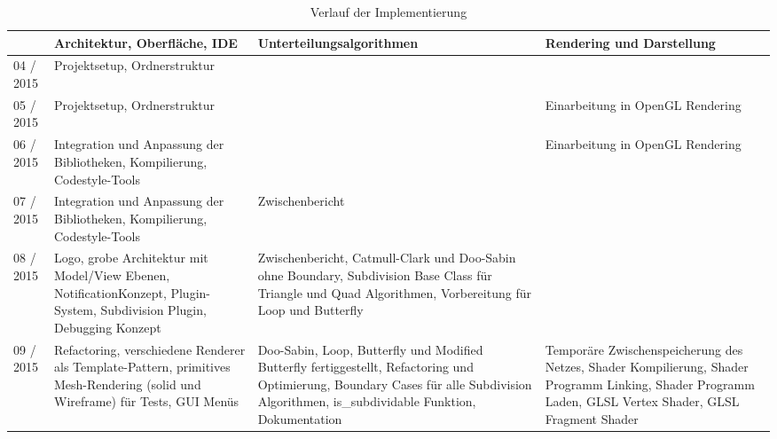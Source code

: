 \begin{table}[]
\vspace*{-40mm}

\center
\caption{Verlauf der Implementierung}

\hspace*{-24mm}
\begin{tabular}{|p{1.6cm}|p{5cm}|p{5cm}|p{5cm}|}
\hline
		  
		  & Architektur, Oberfläche, IDE
      	  & Unterteilungsalgorithmen
      	  & Rendering und Darstellung
      	  \\
    	  
\hline
          
04 / 2015 & Projektsetup, Ordnerstruktur 
          & 
          &
      	  \\
         
\hline

05 / 2015 & Projektsetup, Ordnerstruktur
		  & 
		  & Einarbeitung in OpenGL Rendering
		  \\
		  
\hline

06 / 2015 & Integration und Anpassung
			der Bibliotheken, Kompilierung,
			Codestyle-Tools
		  &
		  & Einarbeitung in OpenGL Rendering
		  \\
		  
\hline

07 / 2015 & Integration und Anpassung
			der Bibliotheken, Kompilierung,
			Codestyle-Tools
		  & Zwischenbericht
		  &
		  \\
		  
\hline

08 / 2015 & Logo, grobe Architektur mit
			Model/View Ebenen,
			NotificationKonzept, Plugin-System,
			Subdivision Plugin, Debugging Konzept
          & Zwischenbericht, Catmull-Clark und Doo-Sabin ohne Boundary,
			Subdivision Base Class für Triangle und Quad Algorithmen,
			Vorbereitung für Loop und Butterfly
          &
          \\
          
\hline

09 / 2015 & Refactoring, verschiedene Renderer
			als Template-Pattern, primitives
			Mesh-Rendering (solid und Wireframe)
			für Tests, GUI Menüs
		  & Doo-Sabin, Loop, Butterfly und Modified Butterfly fertiggestellt,
		  	Refactoring und Optimierung, Boundary Cases für alle Subdivision Algorithmen,
		  	is\_subdividable Funktion, Dokumentation
		  & Temporäre Zwischenspeicherung des Netzes,
		  	Shader Kompilierung, Shader Programm Linking,
		  	Shader Programm Laden, GLSL Vertex Shader,
		  	GLSL Fragment Shader
		  \\
		  

\end{tabular}
\end{table}
